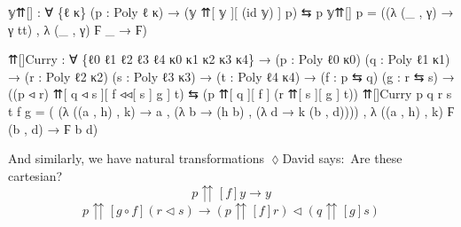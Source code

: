 \documentclass[
  11pt,
  oneside,
  article]{memoir}
\newenvironment{Shaded}{}{}
\newcommand{\NormalTok}[1]{#1}
\newcommand{\OtherTok}[1]{\textcolor[rgb]{0.00,0.44,0.13}{#1}}
\theoremstyle{definition}
\theoremstyle{plain}
\newcommand{\0}{\textsf{0}}
\newcommand{\1}{\tn{\textsf{1}}}
\newcommand{\dnote}[1]{{\quad \color{blue}$\lozenge$\;David says:}~#1\;{\color{blue}$\lozenge$}\quad}
\begin{document}
\begin{Shaded}
\begin{Highlighting}[]
\NormalTok{𝕪⇈[] }\OtherTok{:} \OtherTok{∀} \OtherTok{\{}\NormalTok{ℓ κ}\OtherTok{\}} \OtherTok{(}\NormalTok{p }\OtherTok{:}\NormalTok{ Poly ℓ κ}\OtherTok{)} \OtherTok{→} \OtherTok{(}\NormalTok{𝕪 ⇈[ 𝕪 ][ }\OtherTok{(}\NormalTok{id 𝕪}\OtherTok{)}\NormalTok{ ] p}\OtherTok{)}\NormalTok{ ⇆ p}
\NormalTok{𝕪⇈[] p }\OtherTok{=} \OtherTok{((λ} \OtherTok{(\_}\NormalTok{ , γ}\OtherTok{)} \OtherTok{→}\NormalTok{ γ tt}\OtherTok{)}\NormalTok{ , }\OtherTok{λ} \OtherTok{(\_}\NormalTok{ , γ}\OtherTok{)}\NormalTok{ Ϝ }\OtherTok{\_} \OtherTok{→}\NormalTok{ Ϝ}\OtherTok{)}

\NormalTok{⇈[]Curry }\OtherTok{:} \OtherTok{∀} \OtherTok{\{}\NormalTok{ℓ0 ℓ1 ℓ2 ℓ3 ℓ4 κ0 κ1 κ2 κ3 κ4}\OtherTok{\}}
           \OtherTok{→} \OtherTok{(}\NormalTok{p }\OtherTok{:}\NormalTok{ Poly ℓ0 κ0}\OtherTok{)} \OtherTok{(}\NormalTok{q }\OtherTok{:}\NormalTok{ Poly ℓ1 κ1}\OtherTok{)} 
           \OtherTok{→} \OtherTok{(}\NormalTok{r }\OtherTok{:}\NormalTok{ Poly ℓ2 κ2}\OtherTok{)} \OtherTok{(}\NormalTok{s }\OtherTok{:}\NormalTok{ Poly ℓ3 κ3}\OtherTok{)}
           \OtherTok{→} \OtherTok{(}\NormalTok{t }\OtherTok{:}\NormalTok{ Poly ℓ4 κ4}\OtherTok{)}
           \OtherTok{→} \OtherTok{(}\NormalTok{f }\OtherTok{:}\NormalTok{ p ⇆ q}\OtherTok{)} \OtherTok{(}\NormalTok{g }\OtherTok{:}\NormalTok{ r ⇆ s}\OtherTok{)}
           \OtherTok{→} \OtherTok{((}\NormalTok{p ◃ r}\OtherTok{)}\NormalTok{ ⇈[ q ◃ s ][ f ◃◃[ s ] g ] t}\OtherTok{)} 
\NormalTok{             ⇆ }\OtherTok{(}\NormalTok{p ⇈[ q ][ f ] }\OtherTok{(}\NormalTok{r ⇈[ s ][ g ] t}\OtherTok{))}
\NormalTok{⇈[]Curry p q r s t f g }\OtherTok{=} 
    \OtherTok{(} \OtherTok{(λ} \OtherTok{((}\NormalTok{a , h}\OtherTok{)}\NormalTok{ , k}\OtherTok{)} \OtherTok{→}\NormalTok{ a , }\OtherTok{(λ}\NormalTok{ b }\OtherTok{→} \OtherTok{(}\NormalTok{h b}\OtherTok{)}\NormalTok{ , }\OtherTok{(λ}\NormalTok{ d }\OtherTok{→}\NormalTok{ k }\OtherTok{(}\NormalTok{b , d}\OtherTok{))))} 
\NormalTok{    , }\OtherTok{λ} \OtherTok{((}\NormalTok{a , h}\OtherTok{)}\NormalTok{ , k}\OtherTok{)}\NormalTok{ Ϝ }\OtherTok{(}\NormalTok{b , d}\OtherTok{)} \OtherTok{→}\NormalTok{ Ϝ b d}\OtherTok{)}
\end{Highlighting}
\end{Shaded}

And similarly, we have natural transformations \dnote{Are these cartesian?}
\[
p {\upuparrows}[f] y → y
\] \[
p {\upuparrows}[g \circ f] (r \triangleleft s) \to (p {\upuparrows}[f] r) \triangleleft (q {\upuparrows}[g] s)
\]
\end{document}
